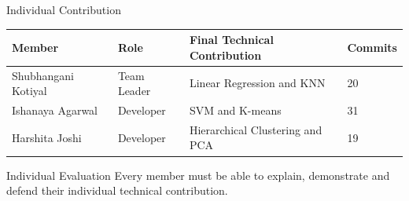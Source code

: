 \documentclass[aspectratio=169,11pt]{beamer}
\begin{document}
\begin{frame}{Individual Contribution}

\scriptsize

\begin{center}

\renewcommand{\arraystretch}{1.35}

\begin{tabularx}{.96\textwidth}
{@{}p{1.8cm}p{1.8cm}X p{1.5cm}@{}}

\toprule
Member &
Role &
Final Technical Contribution &
Commits\\
\midrule

{Shubhangani Kotiyal} &
{Team Leader} &
{Linear Regression and KNN} &
{20}\\

{Ishanaya Agarwal} &
{Developer} &
{SVM and K-means} &
{31}\\

{Harshita Joshi} &
{Developer} &
{Hierarchical Clustering and PCA} &
{19}\\

\bottomrule

\end{tabularx}

\end{center}

\vspace{3mm}

\begin{block}{Individual Evaluation}
Every member must be able to explain, demonstrate and defend
their individual technical contribution.
\end{block}

\end{frame}
\end{document}
